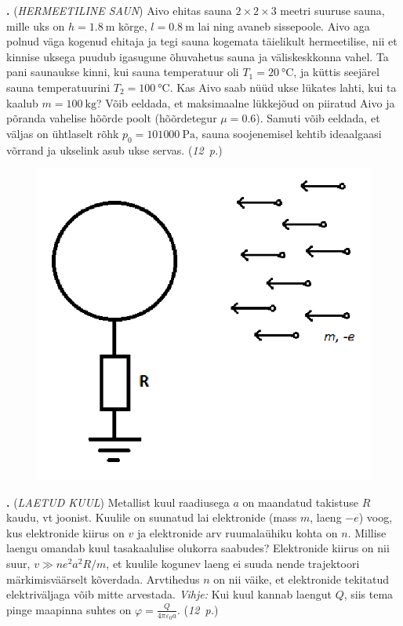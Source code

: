 \documentclass[11pt,a5paper]{article}
\newcommand{\numb}[1]{\vspace{5pt}\textbf{\large #1}}
\newcommand{\nimi}[1]{(\textsl{\small #1})}
\newcommand{\punktid}[1]{(\emph{#1~p.})}
\newcounter{ylesanne}
\newcommand{\yl}[1]{\addtocounter{ylesanne}{1}\numb{\theylesanne.} \nimi{#1} \newblock{}}
\newcommand{\autor}[1]{}%
\begin{document}
\yl{HERMEETILINE SAUN} Aivo ehitas sauna $2\times 2\times 3$ meetri suuruse sauna, mille uks on $h=\SI{1.8}{\m}$ kõrge, $l=\SI{0.8}{\m}$ lai ning avaneb sissepoole. Aivo aga polnud väga kogenud ehitaja ja tegi sauna kogemata täielikult hermeetilise, nii et kinnise uksega puudub igasugune õhuvahetus sauna ja väliskeskkonna vahel. Ta pani saunaukse kinni, kui sauna temperatuur oli $T_1 = \SI{20}{\celsius}$, ja küttis seejärel sauna temperatuurini $T_2 = \SI{100}{\celsius}$. Kas Aivo saab nüüd ukse lükates lahti, kui ta kaalub $m=\SI{100}{\kg}$? Võib eeldada, et maksimaalne lükkejõud on piiratud Aivo ja põranda vahelise hõõrde poolt (hõõrdetegur $\mu=\num{0.6}$). Samuti võib eeldada, et väljas on ühtlaselt rõhk $p_0=\SI{101 000}{\Pa}$, sauna soojenemisel kehtib ideaalgaasi võrrand ja ukselink asub ukse servas.
\punktid{12} \autor{Hannes Kuslap}

\begin{figure}
  \vspace{-25pt}
  \begin{center}
  \includegraphics[width=\linewidth]{laetud-kuul-joonis-v2.png}
  \vspace{-30pt}
  \end{center}
\end{figure}

\newpage

\yl{LAETUD KUUL} Metallist kuul raadiusega $a$ on maandatud takistuse $R$ kaudu, vt joonist. Kuulile on suunatud lai elektronide (mass $m$, laeng $-e$) voog, kus elektronide kiirus on $v$ ja elektronide arv ruumalaühiku kohta on  $n$. Millise laengu omandab kuul tasakaalulise olukorra saabudes? Elektronide kiirus on nii suur, $v \gg n e^2 a^2 R / m$, et kuulile kogunev laeng ei suuda nende trajektoori märkimisväärselt kõverdada. Arvtihedus $n$ on nii väike, et elektronide tekitatud elektriväljaga võib mitte arvestada. \textit{Vihje:} Kui kuul kannab laengut $Q$, siis tema pinge maapinna suhtes on $\varphi = \frac{Q}{4\pi\varepsilon_0 a}$.
\punktid{12} \autor{Konstantin Dukatš}
\end{document}
